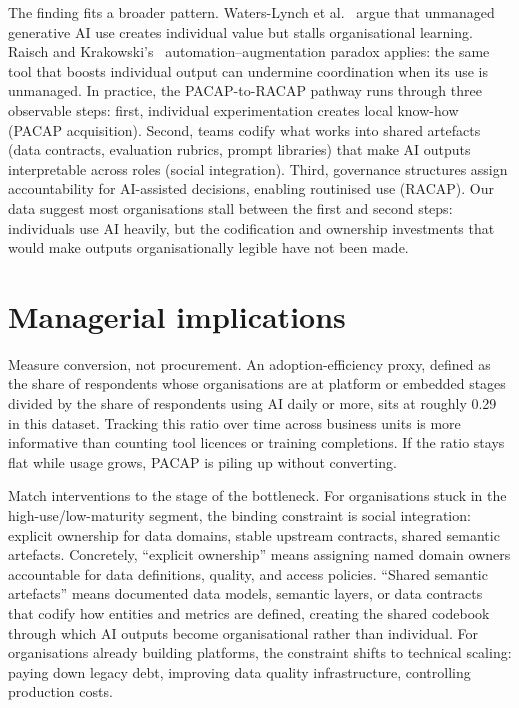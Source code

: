 \documentclass[twocolumn]{article}
\begin{document}
The finding fits a broader pattern. Waters-Lynch et al.~\cite{frey2024shadow} argue that unmanaged generative AI use creates individual value but stalls organisational learning. Raisch and Krakowski's~\cite{raisch2021artificial} automation--augmentation paradox applies: the same tool that boosts individual output can undermine coordination when its use is unmanaged. In practice, the PACAP-to-RACAP pathway runs through three observable steps: first, individual experimentation creates local know-how (PACAP acquisition). Second, teams codify what works into shared artefacts (data contracts, evaluation rubrics, prompt libraries) that make AI outputs interpretable across roles (social integration). Third, governance structures assign accountability for AI-assisted decisions, enabling routinised use (RACAP). Our data suggest most organisations stall between the first and second steps: individuals use AI heavily, but the codification and ownership investments that would make outputs organisationally legible have not been made.


\section{Managerial implications}

Measure conversion, not procurement. An adoption-efficiency proxy, defined as the share of respondents whose organisations are at platform or embedded stages divided by the share of respondents using AI daily or more, sits at roughly 0.29 in this dataset. Tracking this ratio over time across business units is more informative than counting tool licences or training completions. If the ratio stays flat while usage grows, PACAP is piling up without converting.

Match interventions to the stage of the bottleneck. For organisations stuck in the high-use/low-maturity segment, the binding constraint is social integration: explicit ownership for data domains, stable upstream contracts, shared semantic artefacts. Concretely, ``explicit ownership'' means assigning named domain owners accountable for data definitions, quality, and access policies. ``Shared semantic artefacts'' means documented data models, semantic layers, or data contracts that codify how entities and metrics are defined, creating the shared codebook through which AI outputs become organisational rather than individual. For organisations already building platforms, the constraint shifts to technical scaling: paying down legacy debt, improving data quality infrastructure, controlling production costs.
\end{document}
